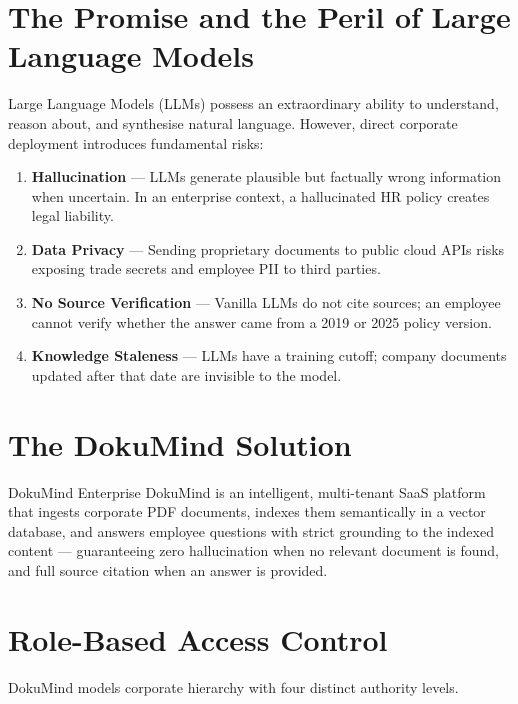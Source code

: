 \documentclass[12pt,a4paper]{report}
\begin{document}
\section{The Promise and the Peril of Large Language Models}

Large Language Models (LLMs) possess an extraordinary ability to understand, reason about, and synthesise natural language. However, direct corporate deployment introduces fundamental risks:

\begin{enumerate}[label=\textbf{\arabic*.}]
  \item \textbf{Hallucination} — LLMs generate plausible but factually wrong information when uncertain. In an enterprise context, a hallucinated HR policy creates legal liability.
  \item \textbf{Data Privacy} — Sending proprietary documents to public cloud APIs risks exposing trade secrets and employee PII to third parties.
  \item \textbf{No Source Verification} — Vanilla LLMs do not cite sources; an employee cannot verify whether the answer came from a 2019 or 2025 policy version.
  \item \textbf{Knowledge Staleness} — LLMs have a training cutoff; company documents updated after that date are invisible to the model.
\end{enumerate}

\section{The DokuMind Solution}

\begin{conceptbox}{DokuMind Enterprise}
DokuMind is an intelligent, multi-tenant SaaS platform that ingests corporate PDF documents, indexes them semantically in a vector database, and answers employee questions with strict grounding to the indexed content — guaranteeing zero hallucination when no relevant document is found, and full source citation when an answer is provided.
\end{conceptbox}

\section{Role-Based Access Control}

DokuMind models corporate hierarchy with four distinct authority levels.
\end{document}
